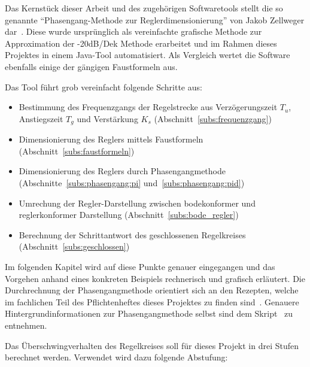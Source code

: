 Das  Kernst\"uck  dieser Arbeit  und  des  zugeh\"origen Softwaretools  stellt
die   so  genannte   ``Phasengang-Methode   zur  Reglerdimensionierung''   von
Jakob   Zellweger   dar~\cite{regelungstechnik:zellweger_short}. Diese   wurde
urspr\"unglich  als  vereinfachte  grafische  Methode  zur  Approximation  der
-20dB/Dek Methode erarbeitet und im Rahmen dieses Projektes in einem Java-Tool
automatisiert. Als  Vergleich   wertet  die  Software  ebenfalls   einige  der
g\"angigen Faustformeln aus.

Das Tool f\"uhrt grob vereinfacht folgende Schritte aus:
\begin{itemize}
    \item
        Bestimmung des  Frequenzgangs der Regelstrecke  aus Verz\"ogerungszeit
        $T_u$,     Anstiegszeit     $T_g$      und     Verst\"arkung     $K_s$
        (Abschnitt~\ref{subs:frequenzgang})
    \item
        Dimensionierung       des      Reglers       mittels      Faustformeln
        (Abschnitt~\ref{subs:faustformeln})
    \item
        Dimensionierung      des      Reglers     durch      Phasengangmethode
        (Abschnitte~\ref{subs:phasengang:pi} und~\ref{subs:phasengang:pid})
    \item
        Umrechung   der   Regler-Darstellung    zwischen   bodekonformer   und
        reglerkonformer Darstellung (Abschnitt~\ref{subs:bode_regler})
    \item
        Berechnung   der   Schrittantwort   des   geschlossenen   Regelkreises
        (Abschnitt~\ref{subs:geschlossen})
\end{itemize}

Im  folgenden   Kapitel  wird  auf   diese  Punkte  genauer   eingegangen  und
das  Vorgehen  anhand  eines  konkreten  Beispiels  rechnerisch  und  grafisch
erl\"autert. Die   Durchrechnung   der   Phasengangmethode   orientiert   sich
an   den   Rezepten,   welche   im   fachlichen   Teil   des   Pflichtenheftes
dieses    Projektes    zu    finden    sind~\cite{ref:pflichtenheft}. Genauere
Hintergrundinformationen    zur    Phasengangmethode     selbst    sind    dem
Skript~\cite{regelungstechnik:zellweger_short} zu entnehmen.

Das \"Uberschwingverhalten des Regelkreises soll  f\"ur dieses Projekt in drei
Stufen  berechnet werden. Verwendet  wird dazu  folgende Abstufung:  

